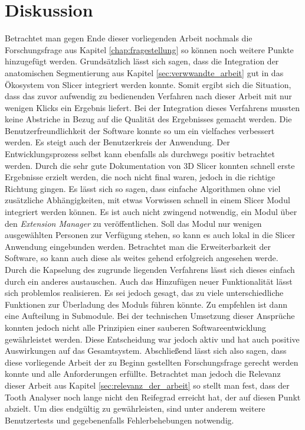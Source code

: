 \chapter{Diskussion}
\label{chap:diskussion} Betrachtet man gegen Ende dieser vorliegenden Arbeit
nochmals die Forschungsfrage aus Kapitel \ref{chap:fragestellung} so können noch
weitere Punkte hinzugefügt werden. Grundsätzlich lässt sich sagen, dass die
Integration der anatomischen Segmentierung aus Kapitel
\ref{sec:verwwandte_arbeit} gut in das Ökosystem von Slicer integriert werden
konnte. Somit ergibt sich die Situation, dass das zuvor aufwendig zu bedienenden
Verfahren nach dieser Arbeit mit nur wenigen Klicks ein Ergebnis liefert. Bei der
Integration dieses Verfahrens mussten keine Abstriche in Bezug auf die Qualität des
Ergebnisses gemacht werden. Die Benutzerfreundlichkeit der Software konnte so um
ein vielfaches verbessert werden. Es steigt auch der Benutzerkreis der Anwendung.
Der Entwicklungsprozess selbst kann ebenfalls als durchwegs positiv betrachtet
werden. Durch die sehr gute Dokumentation von 3D Slicer konnten schnell erste Ergebnisse
erzielt werden, die noch nicht final waren, jedoch in die richtige Richtung gingen.
Es lässt sich so sagen, dass einfache Algorithmen ohne viel zusätzliche Abhängigkeiten,
mit etwas Vorwissen schnell in einem Slicer Modul integriert werden können. Es ist
auch nicht zwingend notwendig, ein Modul über den \textit{Extension Manager} zu veröffentlichen.
Soll das Modul nur wenigen ausgewählten Personen zur Verfügung stehen, so kann es
auch lokal in die Slicer Anwendung eingebunden werden. Betrachtet man die
Erweiterbarkeit der Software, so kann auch diese als weites gehend erfolgreich angesehen
werde. Durch die Kapselung des zugrunde liegenden Verfahrens lässt sich dieses
einfach durch ein anderes austauschen. Auch das Hinzufügen neuer Funktionalität lässt
sich problemlos realisieren. Es sei jedoch gesagt, das zu viele unterschiedliche
Funktionen zur Überladung des Moduls führen könnte. Zu empfehlen ist dann eine
Aufteilung in Submodule. Bei der technischen Umsetzung dieser Ansprüche konnten jedoch
nicht alle Prinzipien einer sauberen Softwareentwicklung gewährleistet werden.
Diese Entscheidung war jedoch aktiv und hat auch positive Auswirkungen auf das
Gesamtsystem. Abschließend lässt sich also sagen, dass diese vorliegende Arbeit
der zu Beginn gestellten Forschungsfrage gerecht werden konnte und alle
Anforderungen erfüllte. Betrachtet man jedoch die Relevanz dieser Arbeit aus Kapitel
\ref{sec:relevanz_der_arbeit} so stellt man fest, dass der Tooth Analyser noch
lange nicht den Reifegrad erreicht hat, der auf diesen Punkt abzielt. Um dies
endgültig zu gewährleisten, sind unter anderem weitere Benutzertests und gegebenenfalls
Fehlerbehebungen notwendig.

